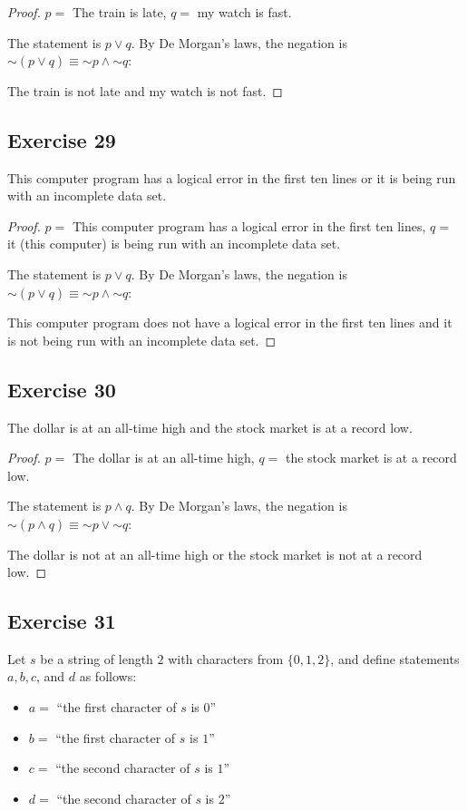 \documentclass[14pt]{extarticle}
\begin{document}
\begin{proof} 
$p =$ The train is late, $q =$ my watch is fast.

The statement is $p \vee q$. By De Morgan's laws, the negation is $\sim(p \vee q) \equiv {\sim p} \wedge {\sim q}$:

The train is not late and my watch is not fast. 
\end{proof}

\subsection{Exercise 29} 
This computer program has a logical error in the first ten lines or it is being run with an incomplete data set.

\begin{proof} 
$p =$ This computer program has a logical error in the first ten lines, $q =$ it (this computer) is being run with an incomplete data set.

The statement is $p \vee q$. By De Morgan's laws, the negation is $\sim(p \vee q) \equiv {\sim p} \wedge {\sim q}$:

This computer program does not have a logical error in the first ten lines and it is not being run with an incomplete data set. 
\end{proof}

\subsection{Exercise 30} 
The dollar is at an all-time high and the stock market is at a record low.

\begin{proof} 
$p =$ The dollar is at an all-time high, $q =$ the stock market is at a record low.

The statement is $p \wedge q$. By De Morgan's laws, the negation is $\sim(p \wedge q) \equiv {\sim p} \vee {\sim q}$:

The dollar is not at an all-time high or the stock market is not at a record low. 
\end{proof}

\subsection{Exercise 31} 
Let $s$ be a string of length $2$ with characters from $\{0, 1, 2\}$, and define statements $a, b, c$, and $d$ as follows:

\begin{itemize} 
\item $a = $ ``the first character of $s$ is $0$'' 
\item $b = $ ``the first character of $s$ is $1$'' 
\item $c = $ ``the second character of $s$ is $1$'' 
\item $d = $ ``the second character of $s$ is $2$'' \end{itemize}
\end{document}
